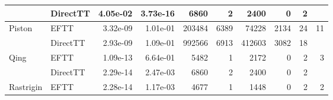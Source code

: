 \begin{table}[!ht]
{\begin{tabular}{llrrrrrrrr}
                                           & DirectTT                        & 4.05e-02                    & 3.73e-16                                           & 6860                           & 2                                                   & 2400                          & 0                                                & 2                                        & {}                                       \\ \hline
            \multirow{2}{*}{Piston}        & EFTT                            & 3.32e-09                    & 1.01e-01                                           & 203484                         & 6389                                                & 74228                         & 2134                                             & 24                                       & {11}                                     \\ %
                                           & DirectTT                        & 2.93e-09                    & 1.09e-01                                           & 992566                         & 6913                                                & 412603                        & 3082                                             & 18                                       & {}                                       \\ \hline
            \multirow{2}{*}{Qing}          & EFTT                            & 1.09e-13                    & 6.64e-01                                           & 5482                           & 1                                                   & 2172                          & 0                                                & 2                                        & {3}                                      \\ %
                                           & DirectTT                        & 2.29e-14                    & 2.47e-03                                           & 6860                           & 2                                                   & 2400                          & 0                                                & 2                                        & {}                                       \\ \hline
            \multirow{2}{*}{Rastrigin}     & EFTT                            & 2.28e-14                    & 1.17e-03                                           & 4677                           & 1                                                   & 1448                          & 0                                                & 2                                        & {2}                                      \\ %

\end{tabular}}
\end{table}
